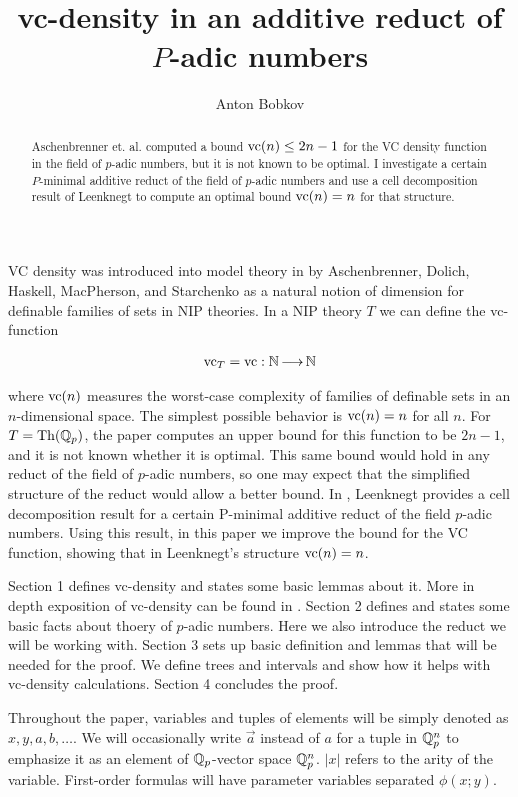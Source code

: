 \documentclass{amsart}
\title{vc-density in an additive reduct of $P$-adic numbers}
\author{Anton Bobkov}
\begin{document}
\begin{abstract}
  Aschenbrenner et. al. computed a bound $\operatorname{vc}(n) \leq 2n - 1$ for the VC density function in the field of $p$-adic numbers,
  but it is not known to be optimal.
  I investigate a certain $P$-minimal additive reduct of the field of $p$-adic numbers and
  use a cell decomposition result of Leenknegt to compute an optimal bound $\operatorname{vc}(n) = n$ for that structure.
\end{abstract}


\maketitle

VC density was introduced into model theory in \cite{density} by Aschenbrenner, Dolich, Haskell, MacPherson, and Starchenko
as a natural notion of dimension for definable families of sets in NIP theories.
In a NIP theory $T$ we can define the vc-function

\begin{align*}
  \operatorname{vc}_T = \operatorname{vc} : \mathbb{N} \operatorname{\longrightarrow} \mathbb{N}
\end{align*}

where $\operatorname{vc}(n)$ measures the worst-case complexity of families of definable sets in an $n$-dimensional space.
The simplest possible behavior is $\operatorname{vc}(n) = n$ for all $n$.
For $T = \operatorname{Th}(\mathbb{Q}_p)$, the paper \cite{density} computes an upper bound for this function to be $2n-1$, and it is not known whether it is optimal.
This same bound would hold in any reduct of the field of $p$-adic numbers, so one may expect that the simplified structure of the reduct would allow a better bound.
In \cite{reduct}, Leenknegt provides a cell decomposition result for a certain P-minimal additive reduct of the field $p$-adic numbers.
Using this result, in this paper we improve the bound for the VC function, showing that in Leenknegt's structure $\operatorname{vc}(n) = n$.

Section 1 defines vc-density and states some basic lemmas about it.
More in depth exposition of vc-density can be found in \cite{density}.
Section 2 defines and states some basic facts about thoery of $p$-adic numbers.
Here we also introduce the reduct we will be working with.
Section 3 sets up basic definition and lemmas that will be needed for the proof.
We define trees and intervals and show how it helps with vc-density calculations.
Section 4 concludes the proof.

Throughout the paper, variables and tuples of elements will be simply denoted as $x, y, a, b, \ldots$.
We will occasionally write $\vec a$ instead of $a$ for a tuple in $\mathbb{Q}_p^n$ to emphasize it as an element of $\mathbb{Q}_p$-vector space $\mathbb{Q}_p^n$.
$|x|$ refers to the arity of the variable.
First-order formulas will have parameter variables separated $\phi(x; y)$.
\end{document}

